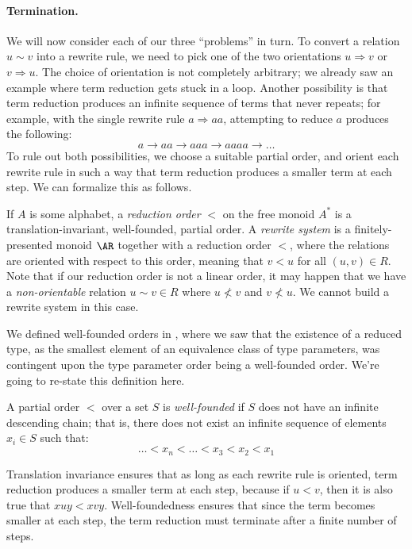 \documentclass[../generics]{subfiles}
\begin{document}
\paragraph{Termination.}  We will now consider each of our three ``problems'' in turn. To convert a relation $u\sim v$ into a rewrite rule, we need to pick one of the two orientations $u\Rightarrow v$ or $v\Rightarrow u$. The choice of orientation is not completely arbitrary; we already saw an example where term reduction gets stuck in a loop. Another possibility is that term reduction produces an infinite sequence of terms that never repeats; for example, with the single rewrite rule $a\Rightarrow aa$, attempting to reduce $a$ produces the following:
\[a\rightarrow aa\rightarrow aaa\rightarrow aaaa\rightarrow\ldots\]
To rule out both possibilities, we choose a suitable partial order, and orient each rewrite rule in such a way that term reduction produces a smaller term at each step. We can formalize this as follows.
\begin{definition}\label{reduction order def}
If $A$ is some alphabet, a \emph{reduction order} $<$ on the free monoid $A^*$ is a translation-invariant, well-founded, partial order. A \emph{rewrite system} is a finitely-presented monoid $\AR$ together with a reduction order $<$, where the relations are oriented with respect to this order, meaning that $v<u$ for all $(u,v)\in R$. Note that if our reduction order is not a linear order, it may happen that we have a \emph{non-orientable} relation $u\sim v\in R$ where $u\not< v$ and $v\not< u$. We cannot build a rewrite system in this case.
\end{definition}
We defined well-founded orders in , where we saw that the existence of a reduced type, as the smallest element of an equivalence class of type parameters, was contingent upon the type parameter order being a well-founded order. We're going to re-state this definition here.
\begin{definition}
A partial order $<$ over a set $S$ is \emph{well-founded} if $S$ does not have an infinite descending chain; that is, there does not exist an infinite sequence of elements $x_i\in S$ such that:
\[\ldots <x_n<\ldots <x_3<x_2<x_1\]
\end{definition}
Translation invariance ensures that as long as each rewrite rule is oriented, term reduction produces a smaller term at each step, because if $u<v$, then it is also true that $xuy<xvy$. Well-foundedness ensures that since the term becomes smaller at each step, the term reduction must terminate after a finite number of steps.
\end{document}
